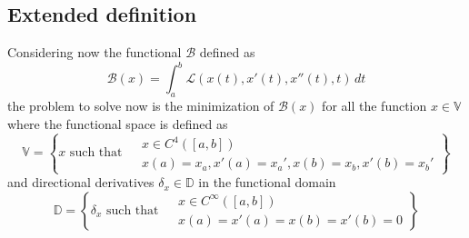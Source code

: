 \subsection*{Extended definition}
	Considering now the functional $\mathcal B$ defined as
	\[ \mathcal B(x) = \int_a^b \mathcal L(x(t),x'(t),x''(t),t)\, dt \]
	the problem to solve now is the minimization of $\mathcal B(x)$ for all the function $x\in \mathds V$ where the functional space is defined as
	\[ \mathds V = \left\{ x \textrm{ such that } \begin{aligned}
		& x\in C^4([a,b]) \\ & x(a) = x_a, x'(a) = x_a', x(b) = x_b, x'(b) = x_b'
	\end{aligned} \right\} \]
	and directional derivatives $\delta_x \in \mathds D$ in the functional domain
	\[ \mathds D = \left\{ \delta_x \textrm{ such that } \begin{aligned}
		& x\in C^\infty([a,b]) \\ & x(a) = x'(a) = x(b) = x'(b) = 0
	\end{aligned} \right\} \]
	
